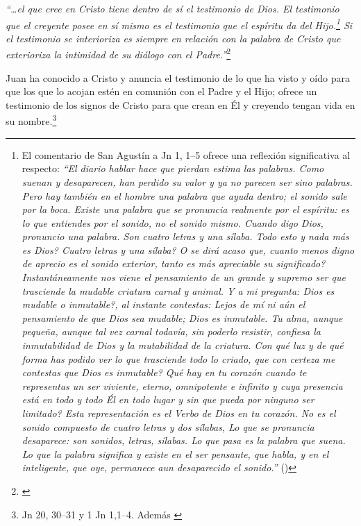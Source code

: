 \documentclass[11pt]{article}
\begin{document}
 \emph{``\ldots{}el que cree en Cristo tiene dentro de sí el testimonio de Dios. El testimonio que el creyente posee en sí mismo es el testimonio que el espíritu da del Hijo.\footnote{El comentario de San Agustín a Jn 1, 1--5 ofrece una reflexión significativa al respecto:
\emph{``El diario hablar hace que pierdan estima las palabras. Como suenan y desaparecen, han perdido su valor y ya no parecen ser sino palabras. Pero hay también en el hombre una palabra que ayuda dentro; el sonido sale por la boca. Existe una palabra que se pronuncia realmente por el espíritu: es lo que entiendes por el sonido, no el sonido mismo. Cuando digo Dios, pronuncio una palabra. Son cuatro letras y una sílaba. \textquestiondown{}Todo esto y nada más es Dios? \textquestiondown{}Cuatro letras y una sílaba? \textquestiondown{}O se dirá acaso que, cuanto menos digno de aprecio es el sonido exterior, tanto es más apreciable su significado? Instantáneamente nos viene el pensamiento de un grande y supremo ser que trasciende la mudable criatura carnal y animal. Y a mi pregunta: \textquestiondown{}Dios es mudable o inmutable?, al instante contestas: Lejos de mí ni aún el pensamiento de que Dios sea mudable; Dios es inmutable. Tu alma, aunque pequeña, aunque tal vez carnal todavía, sin poderlo resistir, confiesa la inmutabilidad de Dios y la mutabilidad de la criatura. \textquestiondown{}Con qué luz y de qué forma has podido ver lo que trasciende todo lo criado, que con certeza me contestas que Dios es inmutable? \textquestiondown{}Qué hay en tu corazón cuando te representas un ser viviente, eterno, omnipotente e infinito y cuya presencia está en todo y todo Él en todo lugar y sin que pueda por ninguno ser limitado? Esta representación es el Verbo de Dios en tu corazón. No es el sonido compuesto de cuatro letras y dos sílabas, Lo que se pronuncia desaparece: son sonidos, letras, sílabas. Lo que pasa es la palabra que suena. Lo que la palabra significa y existe en el ser pensante, que habla, y en el inteligente, que oye, permanece aun desaparecido el sonido.''} (\cite[Tratado I, n.~1, 8]{aguscomentjn}) } Si el testimonio se interioriza es siempre en relación con la palabra de Cristo que exterioriza la intimidad de su diálogo con el Padre.''}\footnote{\cite[1530]{dicctf}}

Juan ha conocido a Cristo y anuncia el testimonio de lo que ha visto y oído para que los que lo acojan estén en comunión con el Padre y el Hijo; ofrece un testimonio de los signos de Cristo para que crean en Él y creyendo tengan vida en su nombre.\footnote{Jn 20, 30--31 y 1 Jn 1,1--4. Además \cite[1530]{dicctf}} 
\end{document}
